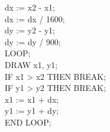 \documentclass{article}
\begin{document}
\begin{multicols}{2}
{\ttfamily
dx := x2 - x1;\\
dx := dx / 1600;\\
dy := y2 - y1;\\
dy := dy / 900;\\
LOOP;\\
DRAW x1, y1;\\
IF x1 > x2 THEN BREAK;\\
IF y1 > y2 THEN BREAK;\\
x1 := x1 + dx;\\
y1 := y1 + dy;\\
END LOOP;}
\par\columnbreak\par
{}
\end{multicols}
\end{document}
